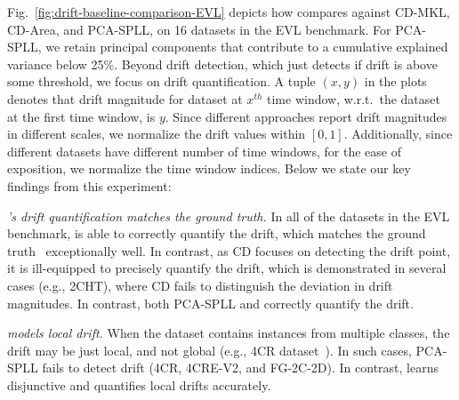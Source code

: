 \smallskip

 Fig.~\ref{fig:drift-baseline-comparison-EVL} depicts how \system
compares against CD-MKL, CD-Area, and PCA-SPLL, on 16 datasets in the
EVL benchmark. For PCA-SPLL, we retain principal components that contribute to
a cumulative explained variance below 25\%. Beyond drift detection, which just
detects if drift is above some threshold, we focus on drift
quantification. A tuple $(x,y)$ in the plots denotes that drift
magnitude for dataset at $x^{th}$ time window, w.r.t.\ the dataset at the first
time window, is $y$. Since different approaches report drift magnitudes in
different scales, we normalize the drift values within $[0, 1]$. Additionally,
since different datasets have different number of time windows,
for the ease of exposition, we normalize the time window indices. Below
we state our key findings from this experiment:


\smallskip 

 
 \emph{\system's drift quantification matches the ground truth.} In
all of the datasets in the EVL benchmark, \system is able to correctly quantify
the drift, which matches the ground truth~\cite{evlVideo} exceptionally well.
In contrast, as CD focuses on detecting the drift point, it is ill-equipped to
precisely quantify the drift, which is demonstrated in several cases (e.g.,
2CHT), where CD fails to distinguish the deviation in drift magnitudes. In
contrast, both PCA-SPLL and \system correctly quantify the drift.


\smallskip

 \emph{\system models local drift.} When the dataset contains
instances from multiple classes, the drift may be just local, and not global
(e.g., 4CR dataset~\citeTechRep). In such cases, PCA-SPLL fails to detect drift
(4CR, 4CRE-V2, and FG-2C-2D). In contrast, \system learns disjunctive
\invariants and quantifies local drifts accurately.


